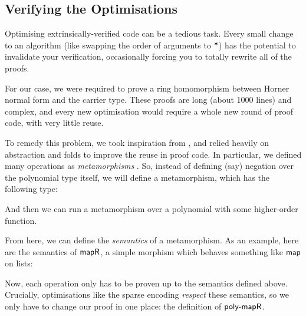 \documentclass[acmsmall,review,anonymous]{acmart}\settopmatter{printfolios=true,printccs=false,printacmref=false}
\begin{document}
\subsection{Verifying the Optimisations}
Optimising extrinsically-verified code can be a tedious task. Every small change
to an algorithm (like swapping the order of arguments to \(\AgdaFunction{*}\))
has the potential to invalidate your verification, occasionally forcing you to
totally rewrite all of the proofs.

For our case, we were required to prove a ring homomorphism between Horner
normal form and the carrier type. These proofs are long (about 1000 lines) and
complex, and every new optimisation would require a whole new round of proof
code, with very little reuse.

To remedy this problem, we took inspiration from \citet{mu_algebra_2009}, and
relied heavily on abstraction and folds to improve the reuse in proof code. In
particular, we defined many operations as \emph{metamorphisms}
\cite{gibbons_metamorphisms_2007}. So, instead of defining (say) negation over
the polynomial type itself, we will define a metamorphism, which has the
following type:
\begin{center}
\end{center}
And then we can run a metamorphism over a polynomial with some higher-order
function.

From here, we can define the \emph{semantics} of a metamorphism. As an example,
here are the semantics of \(\AgdaFunction{mapR}\), a simple morphism which
behaves something like \(\AgdaFunction{map}\) on lists:

\begin{center}
\end{center}

Now, each operation only has to be proven up to the semantics defined above.
Crucially, optimisations like the sparse encoding \emph{respect} these
semantics, so we only have to change our proof in one place: the definition of
\(\AgdaFunction{poly-mapR}\).
\end{document}
